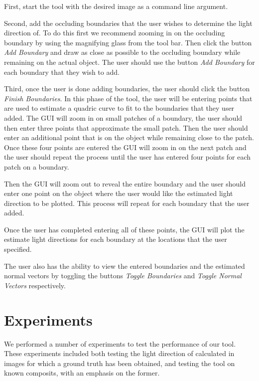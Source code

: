 \documentclass[10pt,twocolumn,letterpaper]{article}
\begin{document}
First, start the tool with the desired image as a command line argument. 

Second, add the occluding boundaries that the user wishes to determine the light direction of. To do this first we recommend zooming in on the occluding boundary by using the magnifying glass from the tool bar. Then click the button \emph{Add Boundary} and draw as close as possible to the occluding boundary while remaining on the actual object. The user should use the button \emph{Add Boundary} for each boundary that they wish to add. 

Third, once the user is done adding boundaries, the user should click the button \emph{Finish Boundaries}. In this phase of the tool, the user will be entering points that are used to estimate a quadric curve to fit to the boundaries that they user added. The GUI will zoom in on small patches of a boundary, the user should then enter three points that approximate the small patch. Then the user should enter an additional point that is on the object while remaining close to the patch. Once these four points are entered the GUI will zoom in on the next patch and the user should repeat the process until the user has entered four points for each patch on a boundary. 

Then the GUI will zoom out to reveal the entire boundary and the user should enter one point on the object where the user would like the estimated light direction to be plotted. This process will repeat for each boundary that the user added.

Once the user has completed entering all of these points, the GUI will plot the estimate light directions for each boundary at the locations that the user specified.

The user also has the ability to view the entered boundaries and the estimated normal vectors by toggling the buttons \emph{Toggle Boundaries} and \emph{Toggle Normal Vectors} respectively. 
\section{Experiments}
We performed a number of experiments to test the performance of our tool. These experiments included both testing the light direction of calculated in images for which a ground truth has been obtained, and testing the tool on known composits, with an emphasis on the former.
\end{document}

